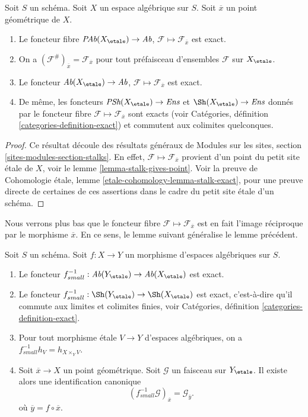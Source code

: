 \begin{lemma}
\label{lemma-stalk-exact}
Soit $S$ un schéma.
Soit $X$ un espace algébrique sur $S$.
Soit $\overline{x}$ un point géométrique de $X$.
\begin{enumerate}
\item Le foncteur fibre
$\textit{PAb}(X_\etale) \to \textit{Ab}$,
$\mathcal{F}  \mapsto  \mathcal{F}_{\overline{x}}$
est exact.
\item On a $(\mathcal{F}^\#)_{\overline{x}} = \mathcal{F}_{\overline{x}}$
pour tout préfaisceau d'ensembles $\mathcal{F}$ sur $X_\etale$.
\item Le foncteur
$\textit{Ab}(X_\etale) \to \textit{Ab}$,
$\mathcal{F} \mapsto \mathcal{F}_{\overline{x}}$ est exact.
\item De même, les foncteurs
$\textit{PSh}(X_\etale) \to \textit{Ens}$ et
$\Sh(X_\etale) \to \textit{Ens}$ donnés par le foncteur fibre
$\mathcal{F} \mapsto \mathcal{F}_{\overline{x}}$ sont exacts (voir
Catégories, définition \ref{categories-definition-exact})
et commutent aux colimites quelconques.
\end{enumerate}
\end{lemma}

\begin{proof}
Ce résultat découle des résultats généraux de
Modules sur les sites, section \ref{sites-modules-section-stalks}.
En effet, $\mathcal{F} \mapsto \mathcal{F}_{\overline{x}}$
provient d'un point du petit site \'etale de $X$, voir le
lemme \ref{lemma-stalk-gives-point}. Voir la preuve de
Cohomologie \'etale, lemme \ref{etale-cohomology-lemma-stalk-exact},
pour une preuve directe de certaines de ces assertions dans le cadre
du petit site \'etale d'un schéma.
\end{proof}

\noindent
Nous verrons plus bas que le foncteur fibre
$\mathcal{F} \mapsto \mathcal{F}_{\overline{x}}$
est en fait l'image réciproque par le morphisme $\overline{x}$. En ce sens,
le lemme suivant généralise le lemme précédent.

\begin{lemma}
\label{lemma-stalk-pullback}
Soit $S$ un schéma.
Soit $f : X \to Y$ un morphisme d'espaces algébriques sur $S$.
\begin{enumerate}
\item Le foncteur
$f_{small}^{-1} :
\textit{Ab}(Y_\etale)
\to
\textit{Ab}(X_\etale)$
est exact.
\item Le foncteur
$f_{small}^{-1} :
\Sh(Y_\etale)
\to
\Sh(X_\etale)$
est exact, c'est-à-dire qu'il commute aux limites et colimites finies, voir
Catégories, définition \ref{categories-definition-exact}.
\item Pour tout morphisme \'etale $V \to Y$ d'espaces algébriques,
on a $f_{small}^{-1}h_V = h_{X \times_Y V}$.
\item Soit $\overline{x} \to X$ un point géométrique.
Soit $\mathcal{G}$ un faisceau sur $Y_\etale$.
Il existe alors une identification canonique
$$
(f_{small}^{-1}\mathcal{G})_{\overline{x}} = \mathcal{G}_{\overline{y}}.
$$
où $\overline{y} = f \circ \overline{x}$.
\end{enumerate}
\end{lemma}

